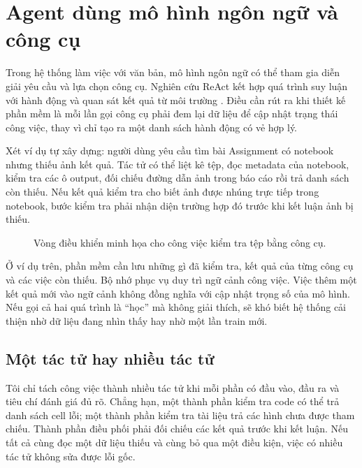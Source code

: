 \clearpage
\section{Agent dùng mô hình ngôn ngữ và công cụ}
Trong hệ thống làm việc với văn bản, mô hình ngôn ngữ có thể tham gia diễn giải yêu cầu và lựa chọn công cụ. Nghiên cứu ReAct kết hợp quá trình suy luận với hành động và quan sát kết quả từ môi trường \cite{react}. Điều cần rút ra khi thiết kế phần mềm là mỗi lần gọi công cụ phải đem lại dữ liệu để cập nhật trạng thái công việc, thay vì chỉ tạo ra một danh sách hành động có vẻ hợp lý.

Xét ví dụ tự xây dựng: người dùng yêu cầu tìm bài Assignment có notebook nhưng thiếu ảnh kết quả. Tác tử có thể liệt kê tệp, đọc metadata của notebook, kiểm tra các ô output, đối chiếu đường dẫn ảnh trong báo cáo rồi trả danh sách còn thiếu. Nếu kết quả kiểm tra cho biết ảnh được nhúng trực tiếp trong notebook, bước kiểm tra phải nhận diện trường hợp đó trước khi kết luận ảnh bị thiếu.

\begin{figure}[H]\centering
{}
\caption{Vòng điều khiển minh họa cho công việc kiểm tra tệp bằng công cụ.}
\end{figure}

Ở ví dụ trên, phần mềm cần lưu những gì đã kiểm tra, kết quả của từng công cụ và các việc còn thiếu. Bộ nhớ phục vụ duy trì ngữ cảnh công việc. Việc thêm một kết quả mới vào ngữ cảnh không đồng nghĩa với cập nhật trọng số của mô hình. Nếu gọi cả hai quá trình là ``học'' mà không giải thích, sẽ khó biết hệ thống cải thiện nhờ dữ liệu đang nhìn thấy hay nhờ một lần train mới.

\subsection{Một tác tử hay nhiều tác tử}
Tôi chỉ tách công việc thành nhiều tác tử khi mỗi phần có đầu vào, đầu ra và tiêu chí đánh giá đủ rõ. Chẳng hạn, một thành phần kiểm tra code có thể trả danh sách cell lỗi; một thành phần kiểm tra tài liệu trả các hình chưa được tham chiếu. Thành phần điều phối phải đối chiếu các kết quả trước khi kết luận. Nếu tất cả cùng đọc một dữ liệu thiếu và cùng bỏ qua một điều kiện, việc có nhiều tác tử không sửa được lỗi gốc.

